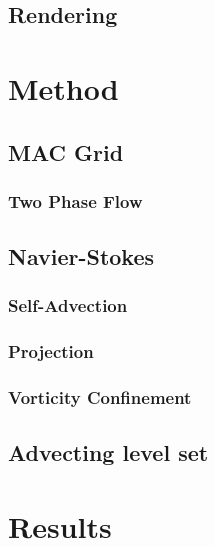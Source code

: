\documentclass[]{report}   %
\begin{document}
\section{Rendering}


\chapter{Method}
\section{MAC Grid}

\subsection{Two Phase Flow}

\section{Navier-Stokes}
\subsection{Self-Advection}

\subsection{Projection}

\subsection{Vorticity Confinement}

\section{Advecting level set}


\chapter{Results}



\endgroup



\end{document}
